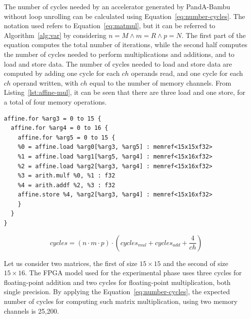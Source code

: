 The number of cycles needed by an accelerator generated by PandA-Bambu without loop unrolling can be calculated using Equation~\ref{eq:number-cycles}.
The notation used refers to Equation~\ref{eq:matmul}, but it can be referred to Algorithm~\ref{alg:var} by considering $n = M \land m=R \land p=N$.
The first part of the equation computes the total number of iterations, while the second half computes the number of cycles needed to perform multiplications and additions, and to load and store data.
The number of cycles needed to load and store data are computed by adding one cycle for each $ch$ operands read, and one cycle for each $ch$ operand written, with $ch$ equal to the number of memory channels.
From Listing~\ref{lst:affine-mul}, it can be seen that there are three load and one store, for a total of four memory operations.

\begin{lstlisting}[label={lst:affine-mul}, caption=Matrix multiplication in MLIR affine dialect, float]
affine.for %arg3 = 0 to 15 {
  affine.for %arg4 = 0 to 16 {
    affine.for %arg5 = 0 to 15 {
    %0 = affine.load %arg0[%arg3, %arg5] : memref<15x15xf32>
    %1 = affine.load %arg1[%arg5, %arg4] : memref<15x16xf32>
    %2 = affine.load %arg2[%arg3, %arg4] : memref<15x16xf32>
    %3 = arith.mulf %0, %1 : f32
    %4 = arith.addf %2, %3 : f32
    affine.store %4, %arg2[%arg3, %arg4] : memref<15x16xf32>
    }
  }
}
\end{lstlisting}

\begin{equation}
    \label{eq:number-cycles}
    cycles = \left(  n \cdot m \cdot p \right) \cdot \left(  cycles_{mul} + cycles_{add} + \frac{4}{ch} \right)
\end{equation}

Let us consider two matrices, the first of size $15\times15$ and the second of size $15\times16$.
The FPGA model used for the experimental phase uses three cycles for floating-point addition and two cycles for floating-point multiplication, both single precision.
By applying the Equation~\ref{eq:number-cycles}, the expected number of cycles for computing such matrix multiplication, using two memory channels is 25,200.

